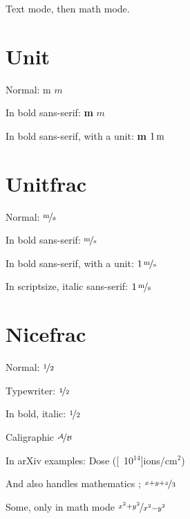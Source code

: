 \documentclass{article}
\begin{document}
Text mode, then math mode.

\section{Unit}
Normal: \unit{m} $\unit{m}$

In bold sans-serif:
{\sffamily\bfseries\unit{m} }
{\sffamily\bfseries$\unit{m}$}

In bold sans-serif, with a unit:
{\sffamily\bfseries\unit[1]{m}}
{\sffamily\bfseries$\unit[1]{m}$}

\section{Unitfrac}
Normal:  $\unitfrac{m}{s}$

In bold sans-serif:
{\sffamily\bfseries{}}
{\sffamily\bfseries$\unitfrac{m}{s}$}

In bold sans-serif, with a unit:
{\sffamily\bfseries{}}
{\sffamily\bfseries$\unitfrac[1]{m}{s}$}

In scriptsize, italic sans-serif:
{\scriptsize\sffamily\itshape{}}
{\scriptsize\sffamily\itshape$\unitfrac[1]{m}{s}$}


\section{Nicefrac}
Normal:  $\nicefrac{1}{2}$

Typewriter:  $\nicefrac[\texttt]{1}{2}$

In bold, italic:
{\bfseries\itshape{}}
{\bfseries\itshape$\nicefrac{1}{2}$}

Caligraphic $\nicefrac[\mathcal]{A}{B}$

In arXiv examples:
Dose (\unit[10$^{14}$]{ions/cm$^2$)}%

And also handles mathematics
; $\nicefrac{x+y+z}{3}$

Some, only in math mode
$\nicefrac{x^2+y^2}{x^2-y^2}$
\end{document}
